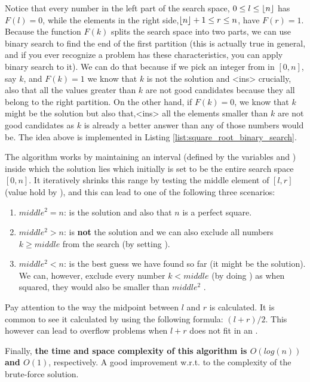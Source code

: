 Notice that every number in the left part of the search space, $0 \leq l \leq \lfloor n\rfloor$ has $F(l) = 0$, while the elements in the right side,$\lfloor n\rfloor+1 \leq r \leq n$, have $F(r) = 1$.
Because the function $F(k)$ splits the search space into two parts, we can use
binary search to find the end of the first partition (this is actually true in general, and if you ever recognize a problem has these characteristics, you can apply binary search to it). 
We can do that because if we pick an integer from in $[0,n]$, say $k$, and $F(k) = 1$ we know that $k$ is not the solution and 
<ins> crucially, also that
all the values greater than $k$ are not good candidates because they all belong to the right partition.
On the other hand, if $F(k) = 0$, we know that $k$ might be the solution but also that,<ins> all the elements smaller than $k$ are not good candidates as $k$ is already a better answer than any of those numbers would be.
The idea above is implemented in Listing \ref{list:square_root_binary_search}. 





The algorithm works by maintaining an interval (defined by the variables  and ) inside which the solution lies which initially is set to be the entire search space $[0,n]$.
It iteratively shrinks this range by 
 testing the middle element of $[l,r]$ (value hold by ), and this can lead to one of the following three scenarios:

 \begin{enumerate}
	 
	 \item $middle^2  = n$:  is the solution and also that $n$ is a perfect square.
	 \item $middle^2  > n$:  is \textbf{not} the solution and we can also exclude
	 all numbers $k \geq middle$ from the search (by setting ).
	 \item $middle^2  < n$:  is the best guess we have found so far (it might be the solution). We can, however, exclude every number $k < middle$ (by doing ) as when squared, they would also be smaller than $middle^2$ .

 \end{enumerate}


Pay attention to the way the midpoint between $l$ and $r$ is calculated. 
It is common to see it calculated by using the following formula: $(l+r)/2$.
This however can lead to overflow problems when $l+r$ does not fit in an .

Finally, \textbf{the time and space complexity of this algorithm is $O(log(n))$ and $O(1)$}, respectively. A good improvement w.r.t. to the complexity of the brute-force solution.

